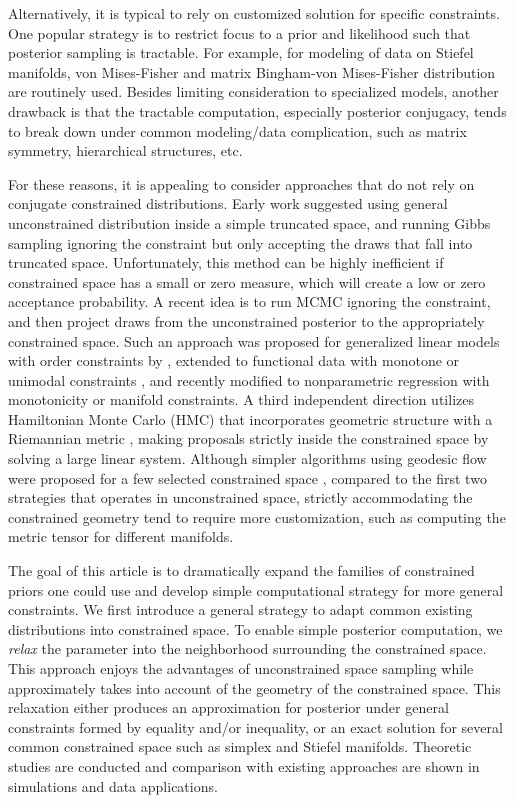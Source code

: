 \documentclass[10pt,fleqn]{article}
\DeclareMathOperator{\1}{\mathbbm{1}}
\begin{document}
Alternatively, it is typical to rely on customized solution for specific
constraints. One popular strategy is to restrict focus to a prior and
likelihood such that posterior sampling is tractable. For example, for
modeling of data on Stiefel manifolds, von Mises-Fisher and matrix Bingham-von
Mises-Fisher distribution  \citep{khatri1977mises,hoff2009simulation} are
routinely used. Besides limiting consideration to specialized models, another  drawback is that the tractable computation, especially posterior conjugacy, tends to break down under common modeling/data complication, such as matrix symmetry, hierarchical structures, etc.

For these reasons, it is appealing to consider approaches that do not rely on conjugate constrained distributions. Early work \citep{gelfand1992bayesian} suggested using general unconstrained distribution inside a simple truncated space, and running Gibbs sampling ignoring the constraint but only accepting the draws that fall into truncated space. Unfortunately, this method can be highly inefficient if constrained space has a small or zero measure, which
will create a low or zero  acceptance probability. A recent  idea is to run MCMC ignoring the constraint, and then project draws from the unconstrained posterior to the appropriately constrained space. Such an approach was proposed for generalized linear models with order constraints by \cite{dunson2003bayesian}, extended to functional data with monotone or unimodal constraints \citep{gunn2005transformation}, and
recently modified to nonparametric regression with monotonicity
\citep{lin2014monogp} or manifold \citep{lin2016extrinsic} constraints. A
third independent direction utilizes Hamiltonian Monte Carlo (HMC) that incorporates geometric structure with a Riemannian metric \citep{girolami2011riemann}, making proposals strictly inside the constrained space by solving a large
linear system. Although simpler
algorithms using  geodesic flow were proposed for a few selected constrained space \citep{byrne2013geodesic}, compared to the first two strategies that
operates in unconstrained space, 
strictly accommodating the constrained geometry tend to require more customization,
such as computing the metric tensor for different manifolds.

 
The goal of this article is to dramatically expand the families of constrained priors one could use and develop simple computational strategy for more general
constraints. We first introduce a general strategy to adapt common existing distributions into constrained space. To enable simple posterior computation, we {\em relax} the parameter into the neighborhood surrounding the constrained space. This 
approach enjoys the advantages of unconstrained space sampling while approximately
takes into account of the geometry of the constrained space. This relaxation either produces an approximation for posterior under general constraints formed by equality and/or inequality, or an exact solution for several common constrained space such as simplex and Stiefel manifolds. Theoretic
studies are conducted and comparison with existing approaches  are shown in simulations and data
applications.
\end{document}
